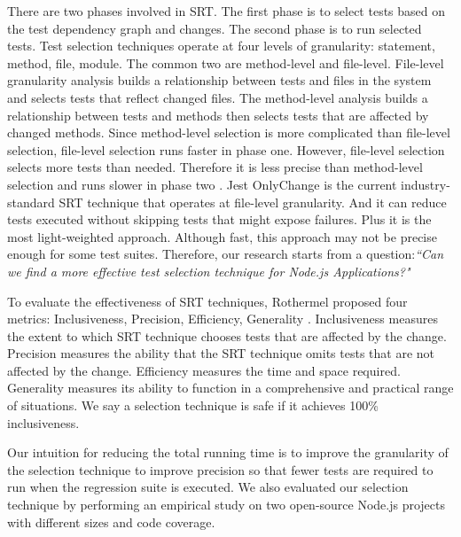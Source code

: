 \documentclass[10pt, conference]{IEEEtran}
\begin{document}
There are two phases involved in SRT. The first phase is to select tests based on the 
test dependency graph and changes. The second phase is to run selected tests.
Test selection techniques operate at four levels of granularity: statement, method, file, module. The common 
two are method-level and file-level. File-level granularity analysis builds a relationship between tests and files in 
the system and selects tests that reflect changed files. The method-level analysis builds a relationship between tests and methods 
then selects tests that are affected by changed methods. Since method-level selection is more complicated than  
file-level selection, file-level selection runs faster in phase one. However, file-level selection selects more 
tests than needed. Therefore it is less precise than method-level selection and runs slower in phase two \cite{b6}.
Jest OnlyChange is the current industry-standard SRT technique that operates at file-level granularity. And it can reduce tests executed 
without skipping tests that might expose failures. Plus it is the most light-weighted approach. Although fast, this approach may not be precise 
enough for some test suites. Therefore, our research starts from a question:\textit{``Can we find a more 
effective test selection technique for Node.js Applications?"} 

To evaluate the effectiveness of SRT techniques, Rothermel proposed four metrics: Inclusiveness, Precision, Efficiency, Generality \cite{b13}. Inclusiveness 
measures the extent to which SRT technique chooses tests that are affected by the change. Precision measures 
the ability that the SRT technique omits tests that are not affected by the change. Efficiency measures the time and 
space required. Generality measures its ability to function in a comprehensive and practical range of situations.
We say a selection technique is safe if it achieves 100\% inclusiveness.

Our intuition for reducing the total running time is to 
improve the granularity of the selection technique to improve precision so that fewer tests are required to run when the regression suite is executed. 
We also evaluated our selection technique by performing an empirical study on two open-source Node.js projects with different 
sizes and code coverage.
\end{document}
